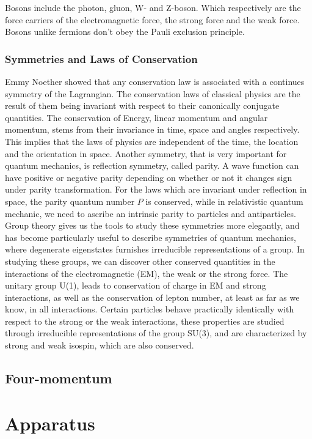 \documentclass[11pt,a4paper]{article}
\begin{document}
Bosons include the photon, gluon, W- and Z-boson. Which respectively are the force carriers of the electromagnetic force, the strong force and the weak force. Bosons unlike fermions don't obey the Pauli exclusion principle. 

\subsubsection{Symmetries and Laws of Conservation} Emmy Noether showed that any
conservation law is associated with a continues symmetry of the Lagrangian. The
conservation laws of classical physics are the result of them being invariant
with respect to their canonically conjugate quantities. The conservation of
Energy, linear momentum and angular momentum, stems from their invariance in
time, space and angles respectively. This implies that the laws of physics are
independent of the time, the location and the orientation in space. Another
symmetry, that is very important for quantum mechanics, is reflection symmetry,
called parity. A wave function can have positive or negative parity depending on
whether or not it changes sign under parity transformation. For the laws which
are invariant under reflection in space, the parity quantum number $P$ is
conserved, while in relativistic quantum mechanic, we need to ascribe an
intrinsic parity to particles and antiparticles.\\

Group theory gives us the tools to study these symmetries more elegantly, and
has become particularly useful to describe symmetries of quantum mechanics,
where degenerate eigenstates furnishes irreducible representations of a group.
In studying these groups, we can discover other conserved quantities in the
interactions of the electromagnetic (EM), the weak or the strong force. The
unitary group U(1), leads to conservation of charge in EM and strong
interactions, as well as the conservation of lepton number, at least as far as
we know, in all interactions. Certain particles behave practically identically
with respect to the strong or the weak interactions, these properties are
studied through irreducible representations of the group SU(3), and are
characterized by strong and weak isospin, which are also conserved.

\subsection{Four-momentum}

\section{Apparatus}
\end{document}
